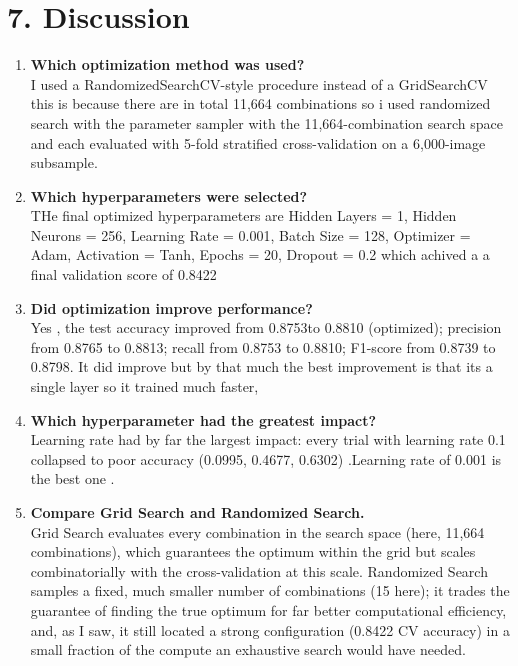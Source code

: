\documentclass[11pt]{article}
\begin{document}
\section*{7. Discussion}

\begin{enumerate}
\item \textbf{Which optimization method was used?}\\
I used a RandomizedSearchCV-style procedure instead of a GridSearchCV this is because there are in total 11,664 combinations 
so i used randomized search with the parameter sampler with the 11,664-combination search space and
each evaluated with 5-fold stratified cross-validation on a 6,000-image subsample. 

\item \textbf{Which hyperparameters were selected?}\\
THe final optimized hyperparameters are 
Hidden Layers = 1, Hidden Neurons = 256, Learning Rate = 0.001, Batch Size = 128, Optimizer =
Adam, Activation = Tanh, Epochs = 20, Dropout = 0.2 
which achived a  a final validation score of 0.8422

\item \textbf{Did optimization improve performance?}\\
Yes , the test accuracy improved from 0.8753to 0.8810 (optimized); precision from 0.8765 to
0.8813; recall from 0.8753 to 0.8810; F1-score from 0.8739 to 0.8798. It did improve but by that much the best improvement is that its a single layer so it trained much faster,

\item \textbf{Which hyperparameter had the greatest impact?}\\
Learning rate had by far the largest impact: every trial with learning rate 0.1 collapsed to poor
accuracy (0.0995, 0.4677, 0.6302) .Learning rate of 0.001 is the best one .


\item \textbf{Compare Grid Search and Randomized Search.}\\
Grid Search  evaluates every combination in the search space (here, 11,664
combinations), which guarantees the optimum within the grid but scales combinatorially with the cross-validation at this scale. Randomized Search samples a fixed, much smaller number of
combinations (15 here); it trades the guarantee of finding the true optimum for far better
computational efficiency, and, as I saw, it still located a strong configuration (0.8422 CV
accuracy) in a small fraction of the compute an exhaustive search would have needed.


\end{enumerate}
\end{document}
